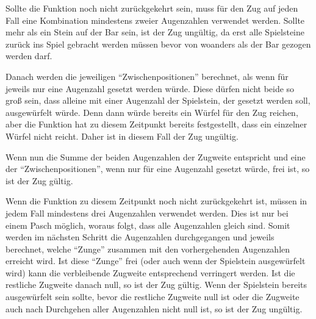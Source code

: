 Sollte die Funktion noch nicht zurückgekehrt sein, muss für den Zug auf jeden Fall eine Kombination mindestens zweier Augenzahlen verwendet werden. Sollte mehr als ein Stein auf der Bar sein, ist der Zug ungültig, da erst alle Spielsteine zurück ins Spiel gebracht werden müssen bevor von woanders als der Bar gezogen werden darf.

Danach werden die jeweiligen "`Zwischenpositionen"' berechnet, als wenn für jeweils nur eine Augenzahl gesetzt werden würde. Diese dürfen nicht beide so groß sein, dass alleine mit einer Augenzahl der Spielstein, der gesetzt werden soll, ausgewürfelt würde. Denn dann würde bereits ein Würfel für den Zug reichen, aber die Funktion hat zu diesem Zeitpunkt bereits festgestellt, dass ein einzelner Würfel nicht reicht. Daher ist in diesem Fall der Zug ungültig.

Wenn nun die Summe der beiden Augenzahlen der Zugweite entspricht und eine der "`Zwischenpositionen"', wenn nur für eine Augenzahl gesetzt würde, frei ist, so ist der Zug gültig.

Wenn die Funktion zu diesem Zeitpunkt noch nicht zurückgekehrt ist, müssen in jedem Fall mindestens drei Augenzahlen verwendet werden. Dies ist nur bei einem Pasch möglich, woraus folgt, dass alle Augenzahlen gleich sind. Somit werden im nächsten Schritt die Augenzahlen durchgegangen und jeweils berechnet, welche "`Zunge"' zusammen mit den vorhergehenden Augenzahlen erreicht wird. Ist diese "`Zunge"' frei (oder auch wenn der Spielstein ausgewürfelt wird) kann die verbleibende Zugweite entsprechend verringert werden. Ist die restliche Zugweite danach null, so ist der Zug gültig. Wenn der Spielstein bereits ausgewürfelt sein sollte, bevor die restliche Zugweite null ist oder die Zugweite auch nach Durchgehen aller Augenzahlen nicht null ist, so ist der Zug ungültig.

